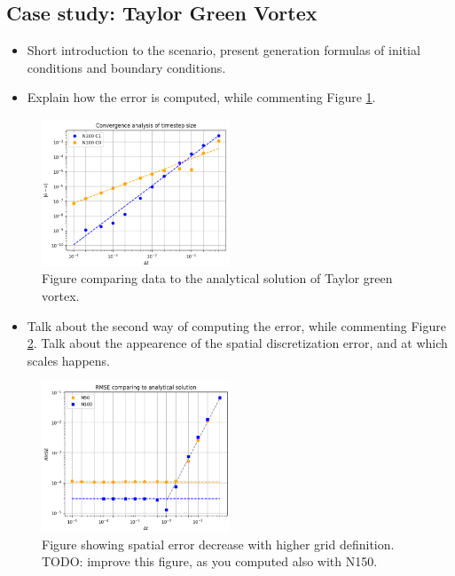 \documentclass[
  english,        %
  font=times,     %
  onecolumn,      %
]{tumarticle}
\begin{document}
\subsection{Case study: Taylor Green Vortex}
\begin{itemize}
    \item Short introduction to the scenario, present generation formulas of initial conditions and boundary conditions.
    \item Explain how the error is computed, while commenting Figure \ref{fig:error_x_y}.
\end{itemize}

\begin{figure}[!ht]
    \centering
    \includegraphics[width=0.5\textwidth]{resources/convergence_study_N100.PNG}
    \caption{Figure comparing data to the analytical solution of Taylor green vortex.}
    \label{fig:error_x_y}
\end{figure}

\begin{itemize}
    \item Talk about the second way of computing the error, while commenting Figure \ref{fig:RMSE}. Talk about the appearence of the spatial discretization error, and at which scales happens.
\end{itemize}

\begin{figure}[!ht]
    \centering
    \includegraphics[width=0.5\textwidth]{resources/RMSE_study.PNG}
    \caption{Figure showing spatial error decrease with higher grid definition. TODO: improve this figure, as you computed also with N150.}
    \label{fig:RMSE}
\end{figure}
\end{document}
